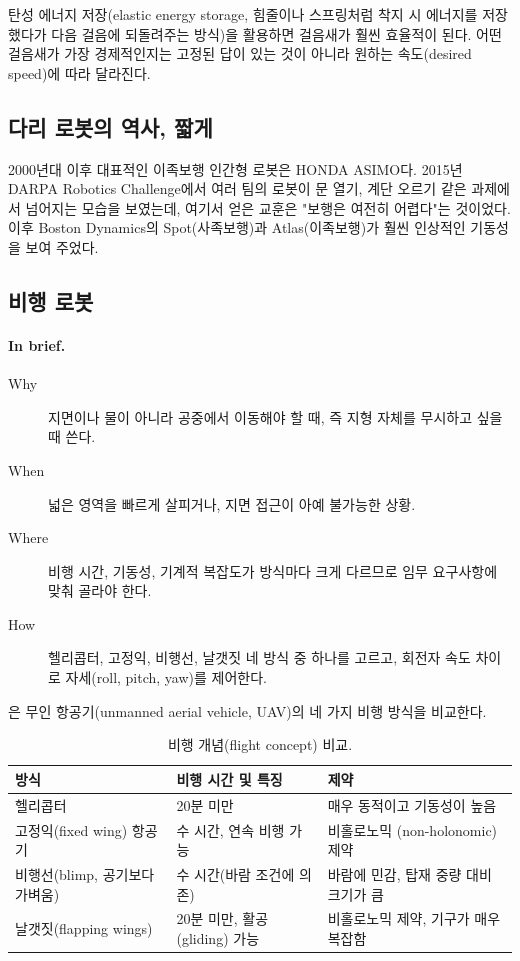 탄성 에너지 저장(elastic energy storage, 힘줄이나 스프링처럼 착지 시 에너지를
저장했다가 다음 걸음에 되돌려주는 방식)을 활용하면 걸음새가 훨씬 효율적이
된다. 어떤 걸음새가 가장 경제적인지는 고정된 답이 있는 것이 아니라 원하는
속도(desired speed)에 따라 달라진다.

\subsection{다리 로봇의 역사, 짧게}
\label{sec:lec02-history}

2000년대 이후 대표적인 이족보행 인간형 로봇은 HONDA ASIMO다. 2015년 DARPA
Robotics Challenge에서 여러 팀의 로봇이 문 열기, 계단 오르기 같은 과제에서
넘어지는 모습을 보였는데, 여기서 얻은 교훈은 "보행은 여전히 어렵다"는 것이었다.
이후 Boston Dynamics의 Spot(사족보행)과 Atlas(이족보행)가 훨씬 인상적인
기동성을 보여 주었다.

\subsection{비행 로봇}
\label{sec:lec02-flying}

\paragraph{In brief.}
\begin{description}
  \item[Why] 지면이나 물이 아니라 공중에서 이동해야 할 때, 즉 지형 자체를
        무시하고 싶을 때 쓴다.
  \item[When] 넓은 영역을 빠르게 살피거나, 지면 접근이 아예 불가능한 상황.
  \item[Where] 비행 시간, 기동성, 기계적 복잡도가 방식마다 크게 다르므로 임무
        요구사항에 맞춰 골라야 한다.
  \item[How] 헬리콥터, 고정익, 비행선, 날갯짓 네 방식 중 하나를 고르고, 회전자
        속도 차이로 자세(roll, pitch, yaw)를 제어한다.
\end{description}

은 무인 항공기(unmanned aerial vehicle, UAV)의 네 가지
비행 방식을 비교한다.

\begin{table}[ht]
\centering
\caption{비행 개념(flight concept) 비교.}
\label{tab:lec02-flight}
\begin{tabularx}{\linewidth}{@{}lLL@{}}
\toprule
방식 & 비행 시간 및 특징 & 제약 \\
\midrule
헬리콥터 & 20분 미만 & 매우 동적이고 기동성이 높음 \\
고정익(fixed wing) 항공기 & 수 시간, 연속 비행 가능 & 비홀로노믹
  (non-holonomic) 제약 \\
비행선(blimp, 공기보다 가벼움) & 수 시간(바람 조건에 의존) & 바람에 민감,
  탑재 중량 대비 크기가 큼 \\
날갯짓(flapping wings) & 20분 미만, 활공(gliding) 가능 & 비홀로노믹 제약,
  기구가 매우 복잡함 \\
\bottomrule
\end{tabularx}
\end{table}

